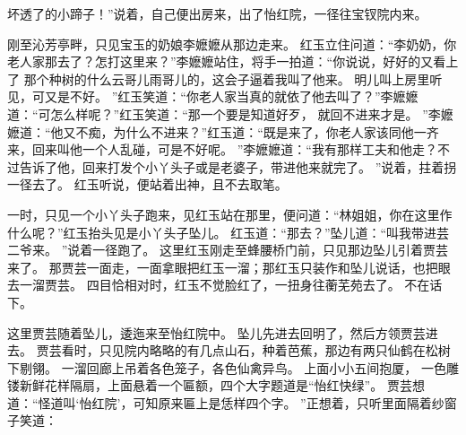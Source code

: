 坏透了的小蹄子！”说着，自己便出房来，出了怡红院，一径往宝钗院内来。
\par
刚至沁芳亭畔，只见宝玉的奶娘李嬷嬷从那边走来。
红玉立住问道：“李奶奶，你老人家那去了？怎打这里来？”李嬷嬷站住，将手一拍道：“你说说，好好的又看上了
那个种树的什么云哥儿雨哥儿的，这会子逼着我叫了他来。
明儿叫上房里听见，可又是不好。
”红玉笑道：“你老人家当真的就依了他去叫了？”李嬷嬷道：“可怎么样呢？”红玉笑道：“那一个要是知道好歹，
就回不进来才是。
”李嬷嬷道：“他又不痴，为什么不进来？”红玉道：“既是来了，你老人家该同他一齐来，回来叫他一个人乱碰，可是不好呢。
”李嬷嬷道：“我有那样工夫和他走？不过告诉了他，回来打发个小丫头子或是老婆子，带进他来就完了。
”说着，拄着拐一径去了。
红玉听说，便站着出神，且不去取笔。
\par
一时，只见一个小丫头子跑来，见红玉站在那里，便问道：“林姐姐，你在这里作什么呢？”红玉抬头见是小丫头子坠儿。
红玉道：“那去？”坠儿道：“叫我带进芸二爷来。
”说着一径跑了。
这里红玉刚走至蜂腰桥门前，只见那边坠儿引着贾芸来了。
那贾芸一面走，一面拿眼把红玉一溜；那红玉只装作和坠儿说话，也把眼去一溜贾芸。
四目恰相对时，红玉不觉脸红了，一扭身往蘅芜苑去了。
不在话下。
\par
这里贾芸随着坠儿，逶迤来至怡红院中。
坠儿先进去回明了，然后方领贾芸进去。
贾芸看时，只见院内略略的有几点山石，种着芭蕉，那边有两只仙鹤在松树下剔翎。
一溜回廊上吊着各色笼子，各色仙禽异鸟。
上面小小五间抱厦，
一色雕镂新鲜花样隔扇，上面悬着一个匾额，四个大字题道是“怡红快绿”。
贾芸想道：“怪道叫‘怡红院’，可知原来匾上是恁样四个字。
”正想着，只听里面隔着纱窗子笑道：
